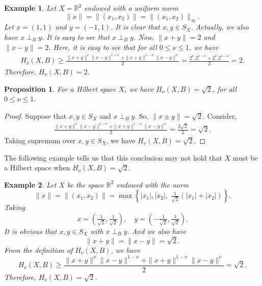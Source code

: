 \documentclass[preprint,12pt]{elsarticle}
\newtheorem{proposition}[thm]{Proposition}
\newtheorem{example}{Example}
\numberwithin{equation}{section}
\begin{document}
\begin{example}
Let $X=\mathbb{R}^2$ endowed with a uniform norm
\[
\|x\| = \|(x_1, x_2)\| =
\|(x_1, x_2)\|_\infty.
\]
 Let 
$x = (1,1)$ and  $y= (-1,1)$.
It is clear that $x,y \in S_X$. Actually, we also have $x \perp_B y$. It is easy to see that $x \perp_B y$. Now, $\|x+y\|=2$ and $\|x-y\|=2$.
Here, it is easy to see that for all $0\leq \nu\leq 1$, we have 
\begin{align*}
H_\nu(X,B)\geq\frac{\|x+y\|^{\nu}\|x-y\|^{1-\nu} + \|x+y\|^{1-\nu}\|x-y\|^{\nu}}{2}=\frac{2^\nu.2^{1-\nu}+2^\nu.2^{1-\nu}}{2}=2.
\end{align*}
Therefore, $H_\nu(X,B)=2$.
\end{example}






\begin{proposition}\label{j01}
For a Hilbert space $X$, we have $ H_{\nu}(X,B)=\sqrt{2}$, for all $0 \leq \nu \leq 1$.
\end{proposition}
\begin{proof}
Suppose that $x,y \in S_X$ and $x\perp_B y$. So, $\|x\pm y\|=\sqrt{2}$.
Consider,
\begin{align*}
\frac{\|x+y\|^{\nu}\|x-y\|^{1-\nu} + \|x+y\|^{1-\nu}\|x-y\|^{\nu}}{2}=\frac{2\sqrt{2}}{2}=\sqrt{2}.    
\end{align*}
Taking supremum over $x,y \in S_X$, we have $H_{\nu}(X,B)=\sqrt{2}$.
\end{proof}
 The following example tells us that this conclusion may not hold that $X$ must be a Hilbert space when $H_{\nu}(X,B) = \sqrt{2}$.
\begin{example}
 Let $X$ be the space $\mathbb{R}^2$ endowed with the norm
\[
\|x\| = \|(x_1, x_2)\| = \max \left\{ |x_1|, |x_2|, \; \tfrac{1}{\sqrt{2}} (|x_1| + |x_2|) \right\}.
\]
Taking 
\[
x = \left( \tfrac{1}{\sqrt{2}}, \tfrac{1}{\sqrt{2}} \right), 
\quad 
y = \left( -\tfrac{1}{\sqrt{2}}, \tfrac{1}{\sqrt{2}} \right).
\]
It is obvious that $x, y \in S_X$ with $x \perp_B y$. And we also have
\[
\|x+y\| = \|x-y\| = \sqrt{2}.
\]
From the definition of $H_{\nu}(X,B)$, we have
\[
H_{\nu}(X,B)\geq\frac{\|x+y\|^{\nu}\|x-y\|^{1-\nu} + \|x+y\|^{1-\nu}\|x-y\|^{\nu}}{2}=\sqrt{2}.
\]
Therefore, $H_{\nu}(X,B)=\sqrt{2}$.
\end{example}
\end{document}
